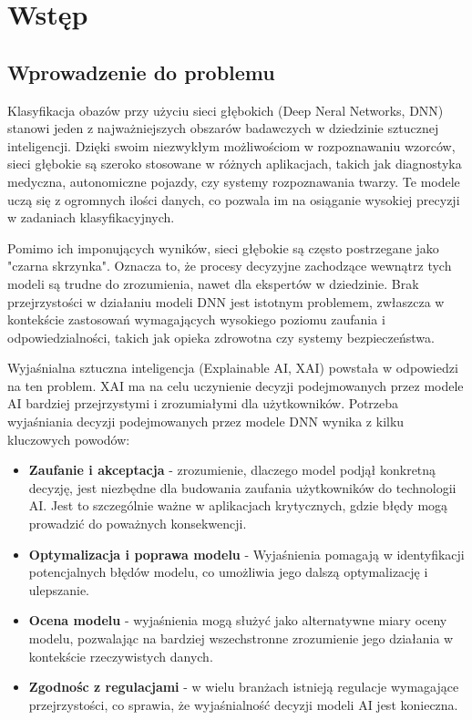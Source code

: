 
\chapter*{Wstęp}

\section*{Wprowadzenie do problemu}
Klasyfikacja obazów przy użyciu sieci głębokich (Deep Neral Networks, DNN) stanowi jeden z najważniejszych obszarów badawczych w dziedzinie sztucznej inteligencji.
Dzięki swoim niezwykłym możliwościom w rozpoznawaniu wzorców, sieci głębokie są szeroko stosowane w różnych aplikacjach, takich jak diagnostyka medyczna, autonomiczne pojazdy, czy systemy rozpoznawania twarzy.
Te modele uczą się z ogromnych ilości danych, co pozwala im na osiąganie wysokiej precyzji w zadaniach klasyfikacyjnych.

Pomimo ich imponujących wyników, sieci głębokie są często postrzegane jako "czarna skrzynka".
Oznacza to, że procesy decyzyjne zachodzące wewnątrz tych modeli są trudne do zrozumienia, nawet dla ekspertów w dziedzinie.
Brak przejrzystości w działaniu modeli DNN jest istotnym problemem, zwłaszcza w kontekście zastosowań wymagających wysokiego poziomu zaufania i odpowiedzialności, takich jak opieka zdrowotna czy systemy bezpieczeństwa.

Wyjaśnialna sztuczna inteligencja (Explainable AI, XAI) powstała w odpowiedzi na ten problem.
XAI ma na celu uczynienie decyzji podejmowanych przez modele AI bardziej przejrzystymi i zrozumiałymi dla użytkowników.
Potrzeba wyjaśniania decyzji podejmowanych przez modele DNN wynika z kilku kluczowych powodów:
\begin{itemize}
  \item \textbf{Zaufanie i akceptacja} - zrozumienie, dlaczego model podjął konkretną decyzję, jest niezbędne dla budowania zaufania użytkowników do technologii AI. 
    Jest to szczególnie ważne w aplikacjach krytycznych, gdzie błędy mogą prowadzić do poważnych konsekwencji. 
  \item \textbf{Optymalizacja i poprawa modelu} - Wyjaśnienia pomagają w identyfikacji potencjalnych błędów modelu, co umożliwia jego dalszą optymalizację i ulepszanie.
  \item \textbf{Ocena modelu} - wyjaśnienia mogą służyć jako alternatywne miary oceny modelu, pozwalając na bardziej wszechstronne zrozumienie jego działania w kontekście rzeczywistych danych.
  \item \textbf{Zgodnośc z regulacjami} - w wielu branżach istnieją regulacje wymagające przejrzystości, co sprawia, że wyjaśnialność decyzji modeli AI jest konieczna.
\end{itemize}

